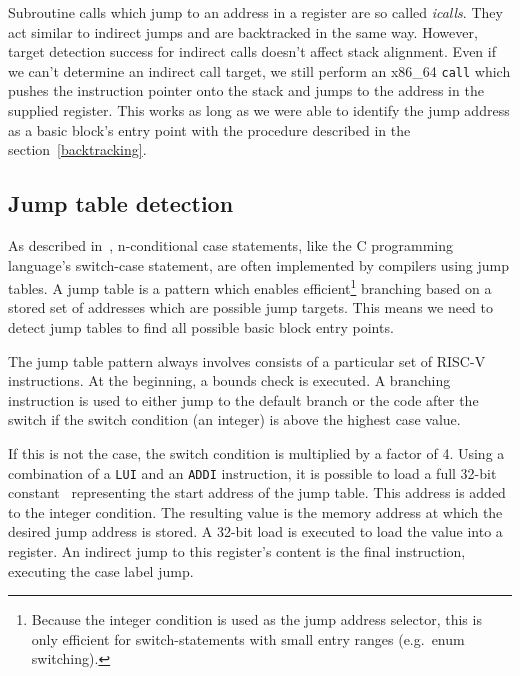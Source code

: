 \documentclass[course=eragp]{aspdoc}
\begin{document}
\par

Subroutine calls which jump to an address in a register are so called \emph{icalls}. They act
similar to indirect jumps and are backtracked in the same way. However, target detection success for indirect calls
doesn't affect stack alignment. Even if we can't determine an indirect call target, we still perform
an x86\_64 \texttt{call} which pushes the instruction pointer onto the stack and jumps to the address
in the supplied register. This works as long as we were able to identify the jump address as a basic
block's entry point with the procedure described in the section\ \ref{backtracking}.

\subsection{Jump table detection}

As described in\ \cite{jump_table_paper}, n-conditional case statements, like the C programming
language's switch-case statement, are often implemented by compilers using jump
tables. A jump table is a pattern which enables efficient\footnote{Because the integer condition is
    used as the jump address selector, this is only efficient for switch-statements with small entry
    ranges (e.g.\ enum switching).} branching based
on a stored set of addresses which are possible jump targets. This means we need to detect jump tables to find
all possible basic block entry points.

\par

The jump table pattern always involves consists of a particular set of RISC-V instructions.
At the beginning, a bounds check is executed. A branching instruction is used to either jump to the
default branch or the code after the switch if the switch condition (an integer) is above the
highest case value.

\par

If this is not the case, the switch condition is multiplied by a factor of 4.
Using a combination of a \texttt{LUI} and an \texttt{ADDI} instruction, it is possible to load a full
32-bit constant\ \cite[p.~19]{rvspec} representing the start address of the jump table.
This address is added to the integer condition. The resulting value is the memory address
at which the desired jump address is stored. A 32-bit load is executed to load the value into a
register. An indirect jump to this register's content is the final instruction, executing the case
label jump.
\end{document}
